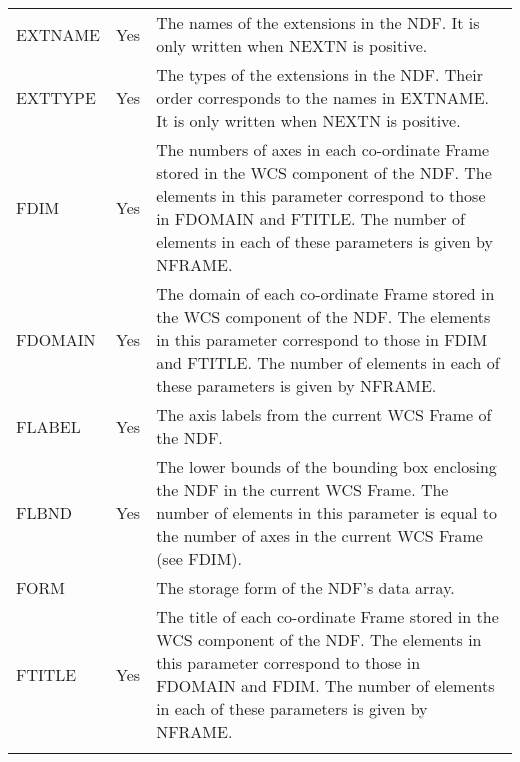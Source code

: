 \documentclass[twoside,11pt,nolof]{starlink}
\begin{document}
\begin{center}
\begin{tabular}{lcp{112mm}}
EXTNAME & Yes & The names of the extensions in the NDF.  It is only written
                when NEXTN is positive. \\
EXTTYPE & Yes & The types of the extensions in the NDF.  Their order
                corresponds to the names in EXTNAME.  It is only written when
                NEXTN is positive. \\
FDIM & Yes & The numbers of axes in each co-ordinate Frame stored in the WCS
             component of the NDF. The elements in this parameter correspond to
             those in FDOMAIN and FTITLE. The number of elements in
             each of these parameters is given by NFRAME. \\
FDOMAIN & Yes & The domain of each co-ordinate Frame stored in the WCS component
                of the NDF. The elements in this parameter correspond to those in
                FDIM and FTITLE. The number of elements in each of these
                parameters is given by NFRAME. \\
FLABEL & Yes & The axis labels from the current WCS Frame of the NDF. \\
FLBND  & Yes & The lower bounds of the bounding box enclosing the NDF in the
               current WCS Frame. The number of elements in this parameter is equal
               to the number of axes in the current WCS Frame (see FDIM).\\
FORM & & The storage form of the NDF's data array. \\
FTITLE & Yes & The title of each co-ordinate Frame stored in the WCS component
                of the NDF. The elements in this parameter correspond to those in
                FDOMAIN and FDIM.  The number of elements in each of these
                parameters is given by NFRAME. \\
\\ \hline
\end{tabular}
\end{center}
\end{document}
